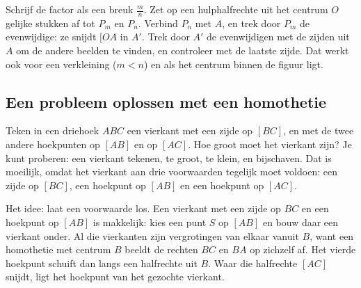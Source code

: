 \begin{werkwijze}
Schrijf de factor als een breuk $\tfrac{m}{n}$. Zet op een hulphalfrechte uit het centrum $O$ gelijke stukken af tot $P_m$ en $P_n$. Verbind $P_n$ met $A$, en trek door $P_m$ de evenwijdige: ze snijdt $[OA$ in $A'$. Trek door $A'$ de evenwijdigen met de zijden uit $A$ om de andere beelden te vinden, en controleer met de laatste zijde. Dat werkt ook voor een verkleining ($m < n$) en als het centrum binnen de figuur ligt.
\end{werkwijze}


\begin{oefeningen}
\end{oefeningen}

\subsection{Een probleem oplossen met een homothetie}

Teken in een driehoek $ABC$ een vierkant met een zijde op $[BC]$, en met de twee andere hoekpunten op $[AB]$ en op $[AC]$. Hoe groot moet het vierkant zijn? Je kunt proberen: een vierkant tekenen, te groot, te klein, en bijschaven. Dat is moeilijk, omdat het vierkant aan drie voorwaarden tegelijk moet voldoen: een zijde op $[BC]$, een hoekpunt op $[AB]$ en een hoekpunt op $[AC]$.

Het idee: laat een voorwaarde los. Een vierkant met een zijde op $BC$ en een hoekpunt op $[AB]$ is makkelijk: kies een punt $S$ op $[AB]$ en bouw daar een vierkant onder. Al die vierkanten zijn vergrotingen van elkaar vanuit $B$, want een homothetie met centrum $B$ beeldt de rechten $BC$ en $BA$ op zichzelf af. Het vierde hoekpunt schuift dan langs een halfrechte uit $B$. Waar die halfrechte $[AC]$ snijdt, ligt het hoekpunt van het gezochte vierkant.

